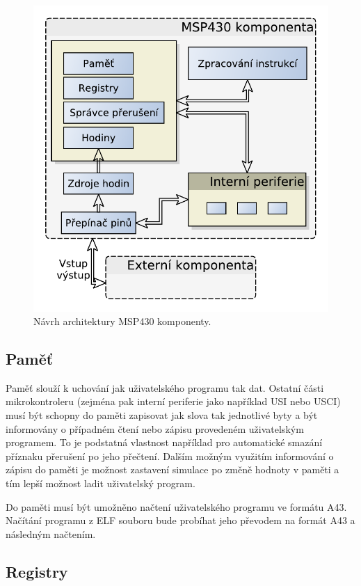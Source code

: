 \begin{figure}[ht]
\centering
\includegraphics[trim=0cm 0cm 0cm 0cm, scale=0.7]{fig/msp430_arch}
\caption{Návrh architektury MSP430 komponenty.}
\label{fig:msp430_arch}
\end{figure}

\subsection{Paměť}

Paměť slouží k uchování jak uživatelského programu tak dat. Ostatní části mikrokontroleru (zejména pak interní periferie jako například USI nebo USCI) musí být schopny do paměti zapisovat jak slova tak jednotlivé byty a být informovány o případném čtení nebo zápisu provedeném uživatelským programem. To je podstatná vlastnost například pro automatické smazání příznaku přerušení po jeho přečtení. Dalším možným využitím informování o zápisu do paměti je možnost zastavení simulace po změně hodnoty v paměti a tím lepší možnost ladit uživatelský program.

Do paměti musí být umožněno načtení uživatelského programu ve formátu A43. Načítání programu z ELF souboru bude probíhat jeho převodem na formát A43 a následným načtením.

\subsection{Registry}

